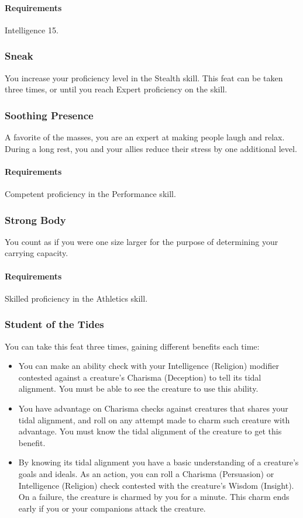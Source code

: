     \paragraph{Requirements} Intelligence 15.
\subsubsection{Sneak} \label{feat::sneak}
    You increase your proficiency level in the Stealth skill.
    This feat can be taken three times, or until you reach Expert proficiency on the skill.
\subsubsection{Soothing Presence} \label{feat::soothingpresence}
    A favorite of the masses, you are an expert at making people laugh and relax.
    During a long rest, you and your allies reduce their stress by one additional level.
    \paragraph{Requirements} Competent proficiency in the Performance skill.
\subsubsection{Strong Body} \label{feat::strongbody}
    You count as if you were one size larger for the purpose of determining your carrying capacity.
    \paragraph{Requirements} Skilled proficiency in the Athletics skill.
\subsubsection{Student of the Tides} \label{feat::studentofthetides}
    You can take this feat three times, gaining different benefits each time:
    \begin{itemize}
        \item You can make an ability check with your Intelligence (Religion) modifier contested against a creature's Charisma (Deception) to tell its tidal alignment.
        You must be able to see the creature to use this ability.
        \item You have advantage on Charisma checks against creatures that shares your tidal alignment, and roll on any attempt made to charm such creature with advantage.
        You must know the tidal alignment of the creature to get this benefit.
        \item By knowing its tidal alignment you have a basic understanding of a creature's goals and ideals.
        As an action, you can roll a Charisma (Persuasion) or Intelligence (Religion) check contested with the creature's Wisdom (Insight).
        On a failure, the creature is charmed by you for a minute.
        This charm ends early if you or your companions attack the creature.
    \end{itemize}
